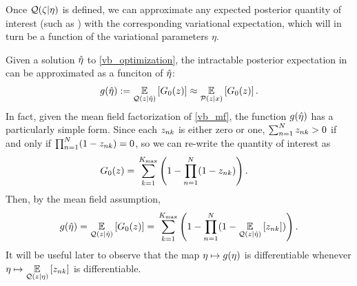 Once $\mathcal{Q}(\zeta \vert \eta)$ is defined,
we can approximate any expected posterior quantity of interest
(such as ) with the
corresponding variational expectation, which will
in turn be a function of the variational parameters $\eta$.

\begin{ex}
%
Given a solution $\hat\eta$ to \eqref{vb_optimization}, the intractable posterior
expectation in  can be approximated as
a funciton of $\hat\eta$:
%
\begin{align*}
%
\g(\etaopt) :={}
    \expect{\q(\z\vert\etaopt)}{\nclusters_0(\z)} \approx
    \expect{\p(\z\vert\x)}{\nclusters_0(\z)}.
%
\end{align*}
%
In fact, given the mean field factorization of \eqref{vb_mf}, the function
$g(\hat\eta)$ has a particularly simple form.  Since each $z_{nk}$ is either
zero or one, $\sum_{n=1}^N z_{nk} > 0$ if and only if $\prod_{n=1}^N (1 -
z_{nk}) = 0$, so we can re-write the quantity of interest as
%
\begin{align*}
%
\nclusters_0(\z) ={}&
    \sumk \left(1 -  \prod_{\n=1}^\N (1 - \z_{\n\k})\right).
%
\end{align*}
%
Then, by the mean field assumption,
%
\begin{align*}
%
g(\etaopt) ={}
\expect{\q(\z \vert \etaopt)}{\nclusters_0(\z)} ={}
    \sumk \left(1 -  \prod_{\n=1}^\N
        (1 - \expect{\q(\z \vert \etaopt)}{\z_{\n\k}})\right).
%
\end{align*}
%
It will be useful later to observe that the map $\eta \mapsto g(\eta)$ is
differentiable whenever $\eta \mapsto \underset{\mathcal{Q}(z \vert \eta)}{\mathbb{E}}\left[z_{nk}\right]$
is differentiable.
%
\end{ex}
